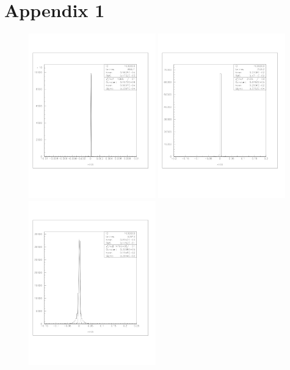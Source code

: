 \documentclass[a4paper]{article}
\begin{document}
\clearpage


\appendix

\section{Appendix 1}

\begin{figure}[!htb]
  \centering
  \includegraphics[width=0.49\textwidth]{ex_images/1_005_010_xslab.jpg}
  \includegraphics[width=0.49\textwidth]{ex_images/1_005_030_xslab.jpg}
  \includegraphics[width=0.49\textwidth]{ex_images/1_005_050_xs.jpg}

\end{figure}
\end{document}
